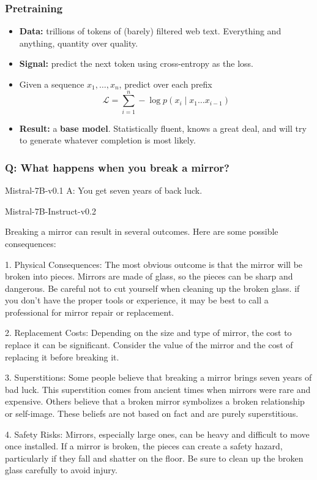 \begin{frame}
\frametitle{Pretraining}
\begin{itemize}
    \item \textbf{Data:} trillions of tokens of (barely) filtered web text.
    Everything and anything, quantity over quality.
    \pause
    \item \textbf{Signal:} predict the next token using cross-entropy as the loss.
    \item Given a sequence $x_1, \ldots, x_n$, predict over each prefix
    $$
    \mathcal{L} = \sum_{i=1}^n - \log p ( x_i \mid x_1 \ldots x_{i-1})
    $$
    \pause
    \item \textbf{Result:} a \textbf{base model}. Statistically fluent, knows a
    great deal, and will try to generate whatever completion is most likely.
\end{itemize}
\end{frame}

\begin{frame}
\frametitle{Q: What happens when you break a mirror?}

\begin{block}{Mistral-7B-v0.1}
A: You get seven years of back luck.
\end{block}

\begin{block}{Mistral-7B-Instruct-v0.2}
\small{
Breaking a mirror can result in several outcomes. Here are some possible consequences:

1. Physical Consequences: The most obvious outcome is that the mirror will be broken into pieces. Mirrors are made of glass, so the pieces can be sharp and dangerous. Be careful not to cut yourself when cleaning up the broken glass. if you don't have the proper tools or experience, it may be best to call a professional for mirror repair or replacement.

2. Replacement Costs: Depending on the size and type of mirror, the cost to replace it can be significant. Consider the value of the mirror and the cost of replacing it before breaking it.

3. Superstitions: Some people believe that breaking a mirror brings seven years of bad luck. This superstition comes from ancient times when mirrors were rare and expensive. Others believe that a broken mirror symbolizes a broken relationship or self-image. These beliefs are not based on fact and are purely superstitious.

4. Safety Risks: Mirrors, especially large ones, can be heavy and difficult to move once installed. If a mirror is broken, the pieces can create a safety hazard, particularly if they fall and shatter on the floor. Be sure to clean up the broken glass carefully to avoid injury.
}
\end{block}

\end{frame}

